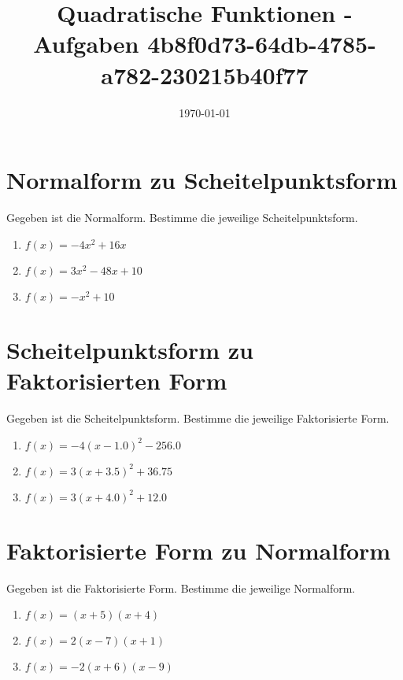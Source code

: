 \documentclass{article}%
\title{Quadratische Funktionen - Aufgaben \newline 4b8f0d73-64db-4785-a782-230215b40f77}%
\date{\today}%
\begin{document}
%
\normalsize%
\maketitle%
\section{Normalform zu Scheitelpunktsform}%
\label{sec:NormalformzuScheitelpunktsform}%
Gegeben ist die Normalform. Bestimme die jeweilige Scheitelpunktsform.%
\begin{enumerate}[label=\alph*)]%
\item%
\newline\vspace{0.5cm} $f(x)=-4x^2 + 16x$%
\item%
\newline\vspace{0.5cm} $f(x)=3x^2 - 48x + 10$%
\item%
\newline\vspace{0.5cm} $f(x)=-x^2 + 10$%
\end{enumerate}

%
\section{Scheitelpunktsform zu Faktorisierten Form}%
\label{sec:ScheitelpunktsformzuFaktorisiertenForm}%
Gegeben ist die Scheitelpunktsform. Bestimme die jeweilige Faktorisierte Form.%
\begin{enumerate}[label=\alph*)]%
\item%
\newline\vspace{0.5cm} $f(x)=-4(x-1.0)^2 -256.0$%
\item%
\newline\vspace{0.5cm} $f(x)=3(x+3.5)^2 +36.75$%
\item%
\newline\vspace{0.5cm} $f(x)=3(x+4.0)^2 +12.0$%
\end{enumerate}

%
\section{Faktorisierte Form zu Normalform}%
\label{sec:FaktorisierteFormzuNormalform}%
Gegeben ist die Faktorisierte Form. Bestimme die jeweilige Normalform.%
\begin{enumerate}[label=\alph*)]%
\item%
\newline\vspace{0.5cm} $f(x)=(x+5)(x+4)$%
\item%
\newline\vspace{0.5cm} $f(x)=2(x-7)(x+1)$%
\item%
\newline\vspace{0.5cm} $f(x)=-2(x+6)(x-9)$%
\end{enumerate}
\end{document}
